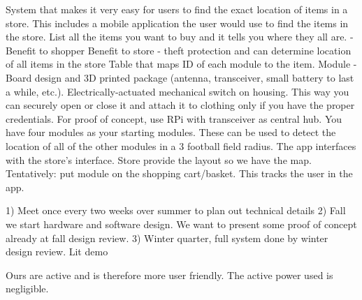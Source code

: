 System that makes it very easy for users to find the exact location of items in a store.
This includes a mobile application the user would use to find the items in the store. List all the items you want to buy and it tells you where they all are. - Benefit to shopper
Benefit to store - theft protection and can determine location of all items in the store
Table that maps ID of each module to the item.
Module - Board design and 3D printed package (antenna, transceiver, small battery to last a while, etc.). Electrically-actuated mechanical switch on housing. This way you can securely open or close it and attach it to clothing only if you have the proper credentials.
For proof of concept, use RPi with transceiver as central hub. You have four modules as your starting modules. These can be used to detect the location of all of the other modules in a 3 football field radius.
The app interfaces with the store's interface.
Store provide the layout so we have the map.
Tentatively: put module on the shopping cart/basket. This tracks the user in the app.

1) Meet once every two weeks over summer to plan out technical details
2) Fall we start hardware and software design. We want to present some proof of concept already at fall design review.
3) Winter quarter, full system done by winter design review. Lit demo

Ours are active and is therefore more user friendly. The active power used is negligible.
